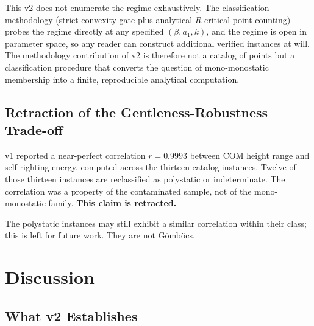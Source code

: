 \documentclass[11pt,a4paper]{article}
\begin{document}
This v2 does not enumerate the regime exhaustively. The
classification methodology (strict-convexity gate plus
analytical $R$-critical-point counting) probes the regime
directly at any specified $(\beta, a_1, k)$, and the regime is
open in parameter space, so any reader can construct additional
verified instances at will. The methodology contribution of v2 is
therefore not a catalog of points but a classification procedure
that converts the question of mono-monostatic membership into a
finite, reproducible analytical computation.

\subsection{Retraction of the Gentleness-Robustness Trade-off}

v1 reported a near-perfect correlation $r = 0.9993$ between COM
height range and self-righting energy, computed across the
thirteen catalog instances. Twelve of those thirteen instances
are reclassified as polystatic or indeterminate. The correlation
was a property of the contaminated sample, not of the
mono-monostatic family. \textbf{This claim is retracted.}

The polystatic instances may still exhibit a similar correlation
within their class; this is left for future work. They are not
G\"omb\"ocs.

\section{Discussion}

\subsection{What v2 Establishes}
\end{document}

